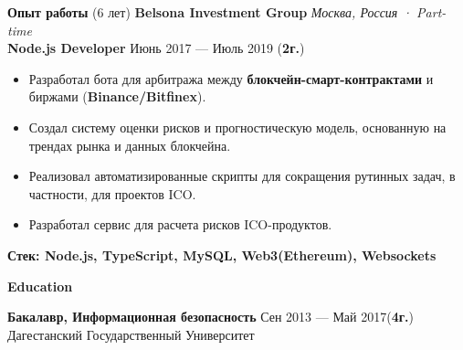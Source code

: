 \documentclass{resume}
\begin{document}
\begin{rSection}{\textbf{Опыт работы} (6 лет) }
    \textbf{Belsona Investment Group} \hfill \textit{Москва, Россия · Part-time} \\
    \textbf{Node.js Developer}  \hfill Июнь 2017 --- Июль 2019 ({\textbf{2г.}})
    \begin{itemize}
        \item Разработал бота для арбитража между \textbf{блокчейн-смарт-контрактами} и биржами (\textbf{Binance/Bitfinex})\@.
        \item Создал систему оценки рисков и прогностическую модель, основанную на трендах рынка и данных блокчейна\@.
        \item Реализовал автоматизированные скрипты для сокращения рутинных задач, в частности, для проектов ICO\@.
        \item Разработал сервис для расчета рисков ICO-продуктов\@.
    \end{itemize}
    \textbf{Стек: Node.js, TypeScript, MySQL, Web3(Ethereum), Websockets}

\end{rSection}


\begin{rSection}{\textbf{Education}}

    \textbf{Бакалавр, Информационная безопасность } \hfill {Сен 2013 --- Май 2017({\textbf{4г.}})} \\
    Дагестанский Государственный Университет

\end{rSection}
\end{document}
